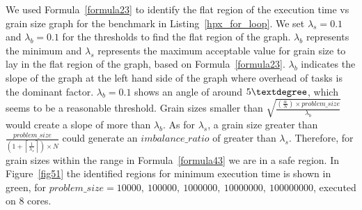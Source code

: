 We used Formula~\ref{formula23} to identify the flat region of the execution time vs grain size graph for the benchmark in Listing~\ref{hpx_for_loop}. We set $\lambda_{s}=0.1$ and $\lambda_{b}=0.1$ for the thresholds to find the flat region of the graph. $\lambda_{b}$ represents the minimum and $\lambda_{s}$ represents the maximum acceptable value for grain size to lay in the flat region of the graph, based on Formula~\ref{formula23}. $\lambda_{b}$ indicates the slope of the graph at the left hand side of the graph where overhead of tasks is the dominant factor. $\lambda_{b}=0.1$ shows an angle of around $5\textdegree$, which seems to be a reasonable threshold. Grain sizes smaller than $\sqrt{\frac{(\frac{\alpha}{N})\times{problem\_{size}}}{{\lambda_b}}}$ would create a slope of more than $\lambda_b$. As for $\lambda_s$, a grain size greater than       
$\frac{problem\_{size}}{(1+\left\lceil{\frac{1}{\lambda_s}}\right\rceil)\times{N}}$ could generate an $imbalance\_{ratio}$ of greater than $\lambda_s$. Therefore, for grain sizes within the range in Formula~\ref{formula43} we are in a safe region. 
In Figure~\ref{fig51} the identified regions for minimum execution time is shown in green, for $problem\_{size}=10000,\:100000,\:1000000,\:10000000,\:100000000$, executed on $8$ cores. 


